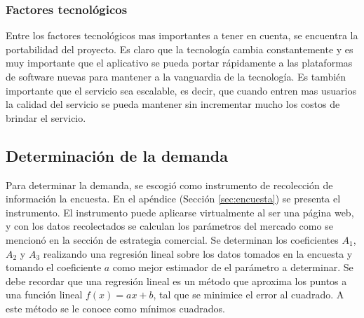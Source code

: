 \documentclass[a4paper, 12pt, oneside]{article}
\begin{document}
	\subsubsection{Factores tecnológicos}
	Entre los factores tecnológicos mas importantes a tener en cuenta, se encuentra la portabilidad del proyecto. Es claro que la tecnología cambia constantemente y es muy importante que el aplicativo se pueda portar rápidamente a las plataformas de software nuevas para mantener a la vanguardia de la tecnología. Es también importante que el servicio sea escalable, es decir, que cuando entren mas usuarios la calidad del servicio se pueda mantener sin incrementar mucho los costos de brindar el servicio.
	
	\subsection{Determinación de la demanda}
	Para determinar la demanda, se escogió como instrumento de recolección de información la encuesta. En el apéndice (Sección \ref{sec:encuesta}) se presenta el instrumento. El instrumento puede aplicarse virtualmente al ser una página web, y con los datos recolectados se calculan los parámetros del mercado como se mencionó en la sección de estrategia comercial. Se determinan los coeficientes $A_1$, $A_2$ y $A_3$ realizando una regresión lineal sobre los datos tomados en la encuesta y tomando el coeficiente $a$ como mejor estimador de el parámetro a determinar. Se debe recordar que una regresión lineal es un método que aproxima los puntos a una función lineal $f(x) = ax + b$, tal que se minimice el error al cuadrado. A este método se le conoce como mínimos cuadrados.

	
\end{document}
